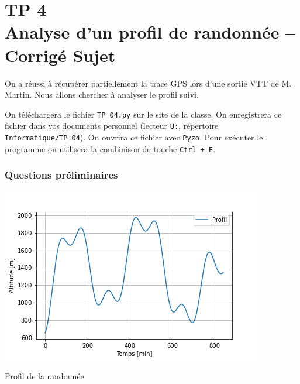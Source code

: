 \chapter*{TP 4 \\
Analyse d'un profil de randonnée -- \ifprof Corrigé \else Sujet \fi}


\iflivret {} \else
\ifprof  {} \else \fi
\fi
\setcounter{question}{0}

\ifprof
\else

On a réussi à récupérer partiellement la trace GPS lors d'une sortie VTT de M. Martin. Nous allons chercher à analyser le profil suivi.

On téléchargera le fichier \lstinline{TP_04.py} sur le site de la classe. On enregistrera ce fichier dans vos documents personnel (lecteur \lstinline{U:}, répertoire \lstinline{Informatique/TP_04}). On ouvrira ce fichier avec \lstinline{Pyzo}.
Pour exécuter le programme on utilisera la combinison de touche \lstinline{Ctrl + E}.
\fi




\subsection*{Questions préliminaires}

\begin{marginfigure}
\centering
\includegraphics[width=\linewidth]{fig_01}
\caption{Profil de la randonnée}
\end{marginfigure}


